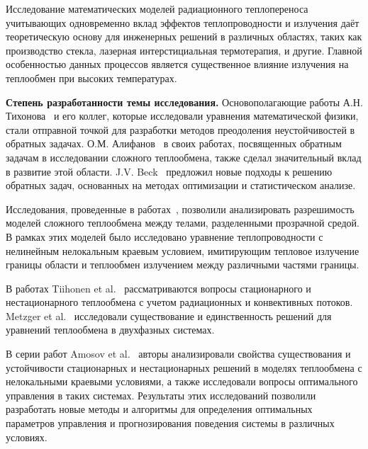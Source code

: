 Исследование математических моделей радиационного теплопереноса учитывающих одновременно
вклад эффектов теплопроводности и излучения даёт теоретическую основу для инженерных
решений в различных областях,
таких как производство стекла,
лазерная интерстициальная термотерапия, и другие.
Главной особенностью данных процессов является существенное влияние излучения
на теплообмен при высоких температурах.




\textbf{Степень разработанности темы исследования.}
Основополагающие работы А.Н. Тихонова~\cite{TikhonovSamarskii1972} и его коллег,
которые исследовали уравнения математической физики, стали отправной точкой для
разработки методов преодоления неустойчивостей в обратных задачах.
О.М. Алифанов~\cite{Aliphanov2009} в своих работах, посвященных обратным задачам
в исследовании сложного теплообмена, также сделал значительный вклад в развитие этой области.
J.V. Beck~\cite[]{Beck1985-fg} предложил новые подходы к решению обратных задач,
основанных на методах оптимизации и статистическом анализе.


Исследования, проведенные в работах~\cite{
    Tiihonen1997a, Tiihonen1997b, metzger1999existence, Amosov2005,
    Amosov2009, Philip2010, Amosov2016, Amosov2017,
    amosov2010stationary, druet2009weak, druet2010weak, laitinen2001conductive
}, позволили анализировать разрешимость моделей сложного теплообмена между телами,
разделенными прозрачной средой.
В рамках этих моделей было исследовано уравнение теплопроводности
с нелинейным нелокальным краевым условием, имитирующим тепловое излучение
границы области и теплообмен излучением между различными частями границы.

В работах Tiihonen et al.~\cite{Tiihonen1997a, Tiihonen1997b} рассматриваются вопросы
стационарного и нестационарного теплообмена с учетом радиационных и конвективных потоков.
Metzger et al.~\cite{metzger1999existence} исследовали существование и единственность
решений для уравнений теплообмена в двухфазных системах.


В серии работ Amosov et al.~\cite{
    Amosov2005, Amosov2009, Amosov2016, Amosov2017, amosov2010stationary
} авторы анализировали свойства существования и устойчивости стационарных
и нестационарных решений в моделях теплообмена с нелокальными краевыми условиями,
а также исследовали вопросы оптимального управления в таких системах.
Результаты этих исследований позволили разработать новые методы и алгоритмы для определения
оптимальных параметров управления и прогнозирования поведения системы в различных условиях.

